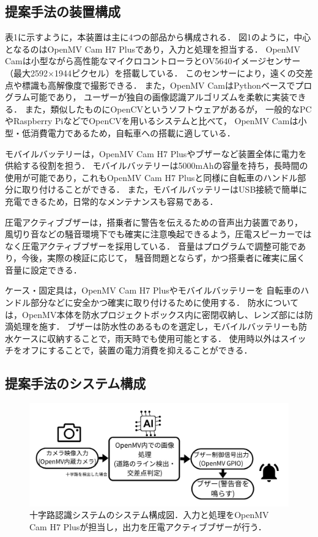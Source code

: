 \documentclass[uplatex,dvipdfmx]{jsarticle}
\begin{document}
\par

\subsection{提案手法の装置構成}
\indent
表1に示すように，本装置は主に4つの部品から構成される．
図1のように，中心となるのはOpenMV Cam H7 Plusであり，入力と処理を担当する．
OpenMV Camは小型ながら高性能なマイクロコントローラとOV5640イメージセンサー（最大2592×1944ピクセル）を搭載している．
このセンサーにより，遠くの交差点や標識も高解像度で撮影できる．
また，OpenMV CamはPythonベースでプログラム可能であり，
ユーザーが独自の画像認識アルゴリズムを柔軟に実装できる．
また，類似したものにOpenCVというソフトウェアがあるが，
一般的なPCやRaspberry PiなどでOpenCVを用いるシステムと比べて，
OpenMV Camは小型・低消費電力であるため，自転車への搭載に適している．
\cite{ref:opencv}
\par
モバイルバッテリーは，OpenMV Cam H7 Plusやブザーなど装置全体に電力を供給する役割を担う．
モバイルバッテリーは5000mAhの容量を持ち，長時間の使用が可能であり，これもOpenMV Cam H7 Plusと同様に自転車のハンドル部分に取り付けることができる．
また，モバイルバッテリーはUSB接続で簡単に充電できるため，日常的なメンテナンスも容易である．
\par
圧電アクティブブザーは，搭乗者に警告を伝えるための音声出力装置であり，
風切り音などの騒音環境下でも確実に注意喚起できるよう，圧電スピーカーではなく圧電アクティブブザーを採用している．
音量はプログラムで調整可能であり，今後，実際の検証に応じて，
騒音問題とならず，かつ搭乗者に確実に届く音量に設定できる．
\par
ケース・固定具は，OpenMV Cam H7 Plusやモバイルバッテリーを
自転車のハンドル部分などに安全かつ確実に取り付けるために使用する．
防水については，OpenMV本体を防水プロジェクトボックス内に密閉収納し、レンズ部には防滴処理を施す．
ブザーは防水性のあるものを選定し，モバイルバッテリーも防水ケースに収納することで，雨天時でも使用可能とする．
使用時以外はスイッチをオフにすることで，装置の電力消費を抑えることができる．
\par

\subsection{提案手法のシステム構成}

\begin{figure}[h]
  \centering
  \includegraphics[width=14cm]{./Figs/system.jpg}
  \caption{十字路認識システムのシステム構成図．入力と処理をOpenMV Cam H7 Plusが担当し，出力を圧電アクティブブザーが行う．}
  \label{fig:system}
\end{figure}
\end{document}
